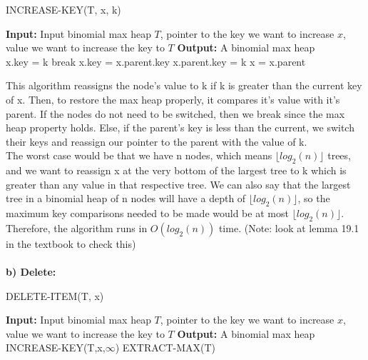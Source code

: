 \documentclass[11pt, a4paper]{article}
\begin{document}
\begin{algorithm} [H]
\caption{INCREASE-KEY(T, x, k)}
\begin{algorithmic}[1]
\State \textbf{Input:} Input binomial max heap \( T \), pointer to the key we want to increase \( x \), value we want to increase the key to \( T \)
\State \textbf{Output:} A binomial max heap
\\
       \State x.key = k
                    \State break
            \EndIf
            \State x.key = x.parent.key
            \State x.parent.key = k
            \State x = x.parent
       \EndWhile
\EndIf

\end{algorithmic}
\end{algorithm}
This algorithm reassigns the node's value to k if k is greater than the current key of x. Then, to restore the max heap properly, it compares it's value with it's parent. If the nodes do not need to be switched, then we break since the max heap property holds. Else, if the parent's key is less than the current, we switch their keys and reassign our pointer to the parent with the value of k. \\
The worst case would be that we have n nodes, which means $\lfloor log_2(n) \rfloor$ trees, and we want to reassign x at the very bottom of the largest tree to k which is greater than any value in that respective tree. We can also say that the largest tree in a binomial heap of n nodes will have a depth of $\lfloor log_2(n) \rfloor$, so the maximum key comparisons needed to be made would be at most $\lfloor log_2(n) \rfloor$. Therefore, the algorithm runs in $O(log_2(n))$ time. (Note: look at lemma 19.1 in the textbook to check this)\\
\\
\textbf{b) Delete:} \\ 

\begin{algorithm} [H]
\caption{DELETE-ITEM(T, x)}
\begin{algorithmic}[1]
\State \textbf{Input:} Input binomial max heap \( T \), pointer to the key we want to increase \( x \), value we want to increase the key to \( T \)
\State \textbf{Output:} A binomial max heap
\\
\State INCREASE-KEY(T,x,$\infty$)
\State EXTRACT-MAX(T) 
\end{algorithmic}
\end{algorithm}
\end{document}
